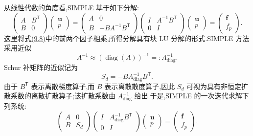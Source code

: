 \begin{example}
从线性代数的角度看,SIMPLE 基于如下分解:
\begin{equation}\label{eq:chapter9-simple-factorization}
\begin{pmatrix}A&B^{\mathsf T}\\B&0\end{pmatrix}
\begin{pmatrix}\bm u\\p\end{pmatrix}
=
\begin{pmatrix}A&0\\B&-BA^{-1}B^{\mathsf T}\end{pmatrix}
\begin{pmatrix}I&A^{-1}B^{\mathsf T}\\0&I\end{pmatrix}
\begin{pmatrix}\bm u\\p\end{pmatrix}
=
\begin{pmatrix}\bm f\\f_p\end{pmatrix}.
\end{equation}
这里将式\hyperref[eq:chapter9-system-factorization]{(9.8)}中的前两个因子相乘,所得分解具有块 LU 分解的形式.SIMPLE 方法采用近似
\[
 A^{-1}\approx (\operatorname{diag}(A))^{-1}=:A_{\mathrm{diag}}^{-1}.
\]
Schur 补矩阵的近似记为
\begin{equation}\label{eq:chapter9-simple-schur}
 S_d=-BA_{\mathrm{diag}}^{-1}B^{\mathsf T}.
\end{equation}
由于 $B^{\mathsf T}$ 表示离散梯度算子,而 $B$ 表示离散散度算子,因此 $S_d$ 可视为具有非恒定扩散系数的离散扩散算子;该扩散系数由 $A_{\mathrm{diag}}^{-1}$ 给出.于是,SIMPLE 的一次迭代求解下列系统:
\begin{equation}\label{eq:chapter9-simple-approximate-system}
\begin{pmatrix}A&0\\B&S_d\end{pmatrix}
\begin{pmatrix}I&A_{\mathrm{diag}}^{-1}B^{\mathsf T}\\0&I\end{pmatrix}
\begin{pmatrix}\bm u\\p\end{pmatrix}
=
\begin{pmatrix}\bm f\\f_p\end{pmatrix}.
\end{equation}


\end{example}
